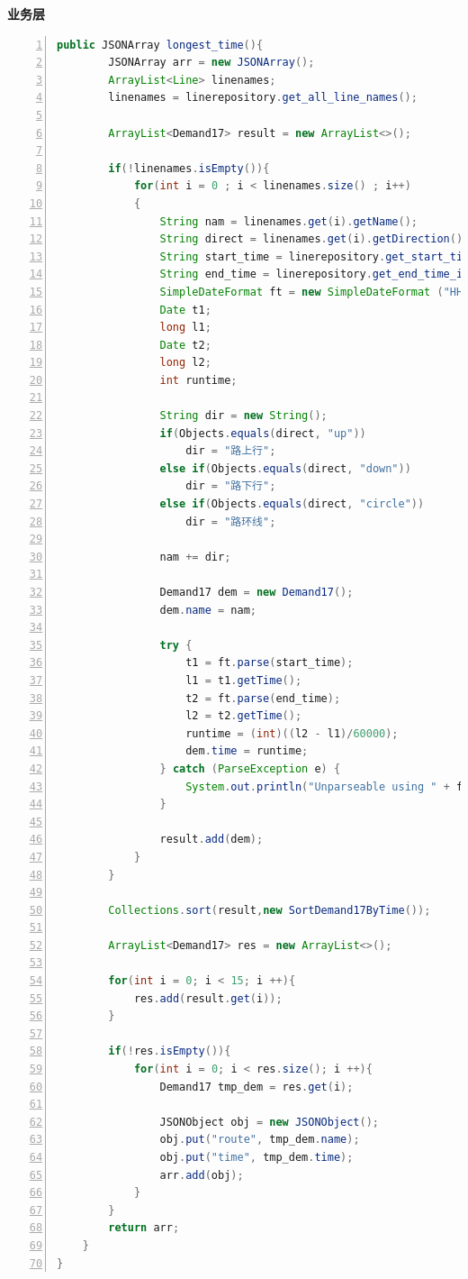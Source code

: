 \documentclass[11pt,a4paper]{article}
\begin{document}
\textbf{业务层} \\
\begin{lstlisting}[numbers = left, 
showstringspaces=false,
showspaces = false,
breaklines = true, 
language=Java]
    public JSONArray longest_time(){
        JSONArray arr = new JSONArray();
        ArrayList<Line> linenames;
        linenames = linerepository.get_all_line_names();

        ArrayList<Demand17> result = new ArrayList<>();

        if(!linenames.isEmpty()){
            for(int i = 0 ; i < linenames.size() ; i++)
            {
                String nam = linenames.get(i).getName();
                String direct = linenames.get(i).getDirection();
                String start_time = linerepository.get_start_time_in_one_run(nam, direct);
                String end_time = linerepository.get_end_time_in_one_run(nam, direct);
                SimpleDateFormat ft = new SimpleDateFormat ("HH:mm");
                Date t1;
                long l1;
                Date t2;
                long l2;
                int runtime;

                String dir = new String();
                if(Objects.equals(direct, "up"))
                    dir = "路上行";
                else if(Objects.equals(direct, "down"))
                    dir = "路下行";
                else if(Objects.equals(direct, "circle"))
                    dir = "路环线";

                nam += dir;

                Demand17 dem = new Demand17();
                dem.name = nam;

                try {
                    t1 = ft.parse(start_time);
                    l1 = t1.getTime();
                    t2 = ft.parse(end_time);
                    l2 = t2.getTime();
                    runtime = (int)((l2 - l1)/60000);
                    dem.time = runtime;
                } catch (ParseException e) {
                    System.out.println("Unparseable using " + ft);
                }

                result.add(dem);
            }
        }

        Collections.sort(result,new SortDemand17ByTime());

        ArrayList<Demand17> res = new ArrayList<>();

        for(int i = 0; i < 15; i ++){
            res.add(result.get(i));
        }

        if(!res.isEmpty()){
            for(int i = 0; i < res.size(); i ++){
                Demand17 tmp_dem = res.get(i);

                JSONObject obj = new JSONObject();
                obj.put("route", tmp_dem.name);
                obj.put("time", tmp_dem.time);
                arr.add(obj);
            }
        }
        return arr;
    }
}
\end{lstlisting} 
\end{document}
